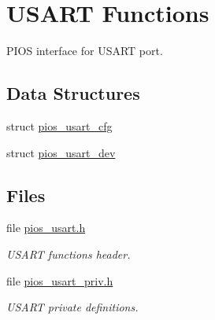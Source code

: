 \hypertarget{group___p_i_o_s___u_s_a_r_t}{\section{\-U\-S\-A\-R\-T \-Functions}
\label{group___p_i_o_s___u_s_a_r_t}
}


\-P\-I\-O\-S interface for \-U\-S\-A\-R\-T port.  


\subsection*{\-Data \-Structures}
\begin{DoxyCompactItemize}
\item 
struct \hyperlink{structpios__usart__cfg}{pios\-\_\-usart\-\_\-cfg}
\item 
struct \hyperlink{structpios__usart__dev}{pios\-\_\-usart\-\_\-dev}
\end{DoxyCompactItemize}
\subsection*{\-Files}
\begin{DoxyCompactItemize}
\item 
file \hyperlink{pios__usart_8h}{pios\-\_\-usart.\-h}
\begin{DoxyCompactList}\small\item\em \-U\-S\-A\-R\-T functions header. \end{DoxyCompactList}\item 
file \hyperlink{pios__usart__priv_8h}{pios\-\_\-usart\-\_\-priv.\-h}
\begin{DoxyCompactList}\small\item\em \-U\-S\-A\-R\-T private definitions. \end{DoxyCompactList}\end{DoxyCompactItemize}
